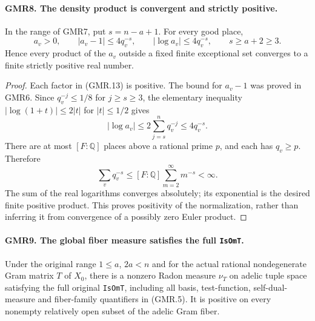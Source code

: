\paragraph{GMR8. The density product is convergent and strictly positive.}
\label{claim:GMR8}
In the range of GMR7, put $s=n-a+1$.  For every good place,
\[
 a_v>0,\qquad |a_v-1|\leq4q_v^{-s},\qquad
 |\log a_v|\leq4q_v^{-s},\qquad s\geq a+2\geq3.
 \tag{GMR.14}
\]
Hence every product of the $a_v$ outside a fixed finite exceptional
set converges to a finite strictly positive real number.

\begin{proof}
Each factor in (GMR.13) is positive.  The bound for $a_v-1$ was proved
in GMR6.  Since $q_v^{-j}\leq1/8$ for $j\geq s\geq3$, the elementary
inequality $|\log(1+t)|\leq2|t|$ for $|t|\leq1/2$ gives
\[
 |\log a_v|\leq2\sum_{j=s}^nq_v^{-j}\leq4q_v^{-s}.
\]
There are at most $[F:\mathbb Q]$ places above a rational prime $p$,
and each has $q_v\geq p$.  Therefore
\[
 \sum_vq_v^{-s}\leq[F:\mathbb Q]\sum_{m=2}^{\infty}m^{-s}<\infty.
\]
The sum of the real logarithms converges absolutely; its exponential
is the desired finite positive product.  This proves positivity of
the normalization, rather than inferring it from convergence of a
possibly zero Euler product.
\end{proof}

\paragraph{GMR9. The global fiber measure satisfies the full \texttt{IsOmT}.}
\label{claim:GMR9}
Under the original range $1\leq a$, $2a<n$ and for the actual rational
nondegenerate Gram matrix $T$ of $X_0$, there is a nonzero Radon measure
$\nu_T$ on adelic tuple space satisfying the full original
\texttt{IsOmT}, including all basis, test-function, self-dual-measure
and fiber-family quantifiers in (GMR.5).  It is positive on every
nonempty relatively open subset of the adelic Gram fiber.

